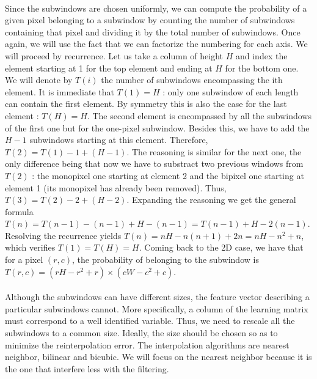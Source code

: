 \documentclass[a4paper]{report}
\begin{document}
		\paragraph{}
		Since the subwindows are chosen uniformly, we can compute the probability of a given pixel belonging to a subwindow by counting the number of subwindows containing that pixel and dividing it by the total number of subwindows. Once again, we will use the fact that we can factorize the numbering for each axis. We will proceed by recurrence. Let us take a column of height $H$ and index the element starting at 1 for the top element and ending at $H$ for the bottom one. We will denote by $T(i)$ the number of subwindows encompassing the ith element. It is immediate that $T(1) = H$ : only one subwindow of each length can contain the first element. By symmetry this is also the case for the last element : $T(H) = H$. The second element is encompassed by all the subwindows of the first one but for the one-pixel subwindow. Besides this, we have to add the $H-1$ subwindows starting at this element. Therefore, $T(2) = T(1) - 1 + (H -1)$. The reasoning is similar for the next one, the only difference being that now we have to substract two previous windows from $T(2)$ : the monopixel one starting at element 2 and the bipixel one starting at element 1 (its monopixel has already been removed). Thus, $T(3) = T(2) - 2 + (H - 2)$. Expanding the reasoning we get the general formula $T(n) = T(n-1) - (n-1) + H - (n-1) = T(n-1) + H - 2(n-1)$. Resolving the recurrence yields $T(n) = nH - n(n+1) + 2n = nH -n^2 + n$, which verifies $T(1) = T(H) = H$. 
		Coming back to the 2D case, we have that for a pixel $(r,c)$, the probability of belonging to the subwindow is $T(r,c) = (rH - r^2 + r) \times (cW - c^2 + c)$.
		
		\paragraph{}
		Although the subwindows can have different sizes, the feature vector describing a particular subwindows cannot. More specifically, a column of the learning matrix must correspond to a well identified variable. Thus, we need to rescale all the subwindows to a common size. Ideally, the size should be chosen so as to minimize the reinterpolation error. The interpolation algorithms are nearest neighbor, bilinear and bicubic. We will focus on the nearest neighbor because it is the one that interfere less with the filtering.
		
\end{document}
